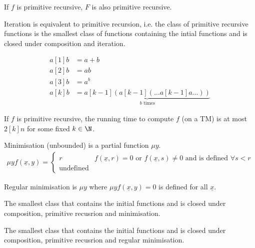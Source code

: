 \documentclass{article}
\begin{document}
\begin{theorem}
    If \(f\) is primitive recursive,
    \(F\) is also primitive recursive.
\end{theorem}
\begin{theorem}
    Iteration is equivalent to primitive recursion,
    i.e. the class of primitive recursive functions
    is the smallest class of functions containing
    the intial functions and is closed under
    composition and iteration. 
\end{theorem}
\begin{definition}[Hyperoperation]
    \begin{align*}
        a[1]b &= a + b \\
        a[2]b &= ab \\
        a[3]b &= a^b \\
        a[k]b &= \underbrace{ a[k-1]( a[k-1] ( \ldots a[k-1]a \ldots ) ) }_{b \text{ times}}
    \end{align*}
\end{definition}
\begin{theorem}
    If \(f\) is primitive recursive,
    the running time to compute \(f\) (on a TM)
    is at most \(2[k]n\) for some fixed \(k\in\N\).
\end{theorem}
\begin{definition}[Minimisation]
    Minimisation (unbounded)
    is a partial function \(\mu y\).
    \begin{align*}
        \mu y f(\underline{x}, y) = \begin{cases}
            r & f(\underline{x}, r) =
            0
            \text{ or } f(\underline{x}, s) \ne 0
            \text{ and is defined } \forall s < r \\
            \text{undefined}
        \end{cases}
    \end{align*}
\end{definition}
\begin{definition}
    Regular minimisation is \(\mu y\) where
    \(\mu y f(\underline{x}, y) = 0\) is defined for all \(\underline{x}\).
\end{definition}
\begin{definition}
The smallest class that contains the initial functions
and is closed under composition, primitive recusrion and minimisation.
\end{definition}
\begin{definition}
The smallest class that contains the initial functions
and is closed under composition, primitive recusrion and regular minimisation.
\end{definition}
\end{document}

